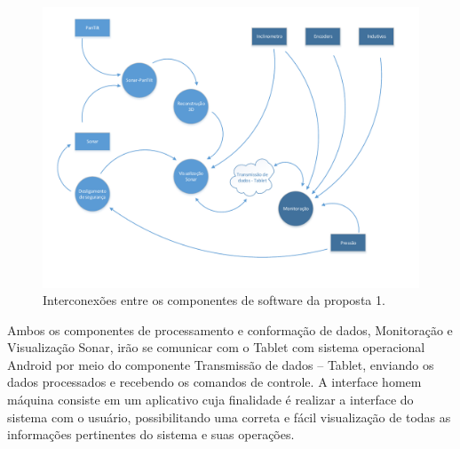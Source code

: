 \begin{figure}[H] 
\centering
\includegraphics[width=\textwidth,height=\textheight,keepaspectratio]{figs/software/EstrutSoft/prop1_soft_2.pdf}
\caption{Interconexões entre os componentes de software da proposta 1.}
\label{fig:ES:1}
\end{figure}

Ambos os componentes de processamento e conformação de dados, Monitoração e
Visualização Sonar, irão se comunicar com o Tablet com sistema operacional
Android por meio do componente Transmissão de dados – Tablet, enviando os dados
processados e recebendo os comandos de controle.  A interface homem máquina
consiste em um aplicativo cuja finalidade é realizar a interface do sistema com
o usuário, possibilitando uma correta e fácil visualização de todas as
informações pertinentes do sistema e suas operações.